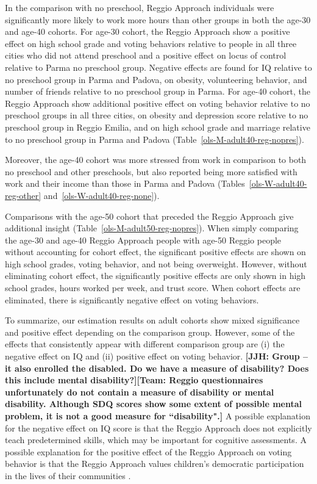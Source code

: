 In the comparison with no preschool, Reggio Approach individuals were significantly more likely to work more hours than other groups in both the age-30 and age-40 cohorts. For age-30 cohort, the Reggio Approach show a positive effect on high school grade and voting behaviors relative to people in all three cities who did not attend preschool and a positive effect on locus of control relative to Parma no preschool group. Negative effects are found for IQ relative to no preschool group in Parma and Padova, on obesity, volunteering behavior, and number of friends relative to no preschool group in Parma. For age-40 cohort, the Reggio Approach show additional positive effect on voting behavior relative to no preschool groups in all three cities, on obesity and depression score relative to no preschool group in Reggio Emilia, and on high school grade and marriage relative to no preschool group in Parma and Padova (Table~\ref{ols-M-adult40-reg-nopres}).

Moreover, the age-40 cohort was more stressed from work in comparison to both no preschool and other preschools, but also reported being more satisfied with work and their income than those in Parma and Padova (Tables~\ref{ols-W-adult40-reg-other} and~\ref{ols-W-adult40-reg-none}).

Comparisons with the age-50 cohort that preceded the Reggio Approach give additional insight (Table~\ref{ols-M-adult50-reg-nopres}). When simply comparing the age-30 and age-40 Reggio Approach people with age-50 Reggio people without accounting for cohort effect, the significant positive effects are shown on high school grades, voting behavior, and not being overweight. However, without eliminating cohort effect, the significantly positive effects are only shown in high school grades, hours worked per week, and trust score. When cohort effects are eliminated, there is significantly negative effect on voting behaviors.

To summarize, our estimation results on adult cohorts show mixed significance and positive effect depending on the comparison group. However, some of the effects that consistently appear with different comparison group are (i) the negative effect on IQ and (ii) positive effect on voting behavior. \textbf{[JJH: Group -- it also enrolled the disabled. Do we have a measure of disability? Does this include mental disability?][Team: Reggio questionnaires unfortunately do not contain a measure of disability or mental disability. Although SDQ scores show some extent of possible mental problem, it is not a good measure for ``disability".]} A possible explanation for the negative effect on IQ score is that the Reggio Approach does not explicitly teach predetermined skills, which may be important for cognitive assessments\citep{Cagliari-etal-eds_2016_BOOK_Loris-Malaguzzi}. A possible explanation for the positive effect of the Reggio Approach on voting behavior is that the Reggio Approach values children's democratic participation in the lives of their communities \citep{Lazzari_2012_Euro-J-Edu}.

